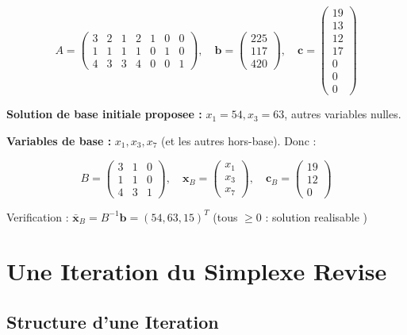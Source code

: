\documentclass[12pt,a4paper]{article}
\begin{document}
\begin{exemple}
$$A = \begin{pmatrix} 3 & 2 & 1 & 2 & 1 & 0 & 0 \\ 1 & 1 & 1 & 1 & 0 & 1 & 0 \\ 4 & 3 & 3 & 4 & 0 & 0 & 1 \end{pmatrix}, \quad \mathbf{b} = \begin{pmatrix} 225 \\ 117 \\ 420 \end{pmatrix}, \quad \mathbf{c} = \begin{pmatrix} 19 \\ 13 \\ 12 \\ 17 \\ 0 \\ 0 \\ 0 \end{pmatrix}$$

\textbf{Solution de base initiale proposee :} $x_1 = 54, x_3 = 63$, autres variables nulles.

\textbf{Variables de base :} $x_1, x_3, x_7$ (et les autres hors-base). Donc :

$$B = \begin{pmatrix} 3 & 1 & 0 \\ 1 & 1 & 0 \\ 4 & 3 & 1 \end{pmatrix}, \quad \mathbf{x}_B = \begin{pmatrix} x_1 \\ x_3 \\ x_7 \end{pmatrix}, \quad \mathbf{c}_B = \begin{pmatrix} 19 \\ 12 \\ 0 \end{pmatrix}$$

Verification : $\bar{\mathbf{x}}_B = B^{-1}\mathbf{b} = (54, 63, 15)^T$ (tous $\geq 0$ : solution realisable \checkmark)
\end{exemple}

\newpage
\section{Une Iteration du Simplexe Revise}

\subsection{Structure d'une Iteration}
\end{document}
